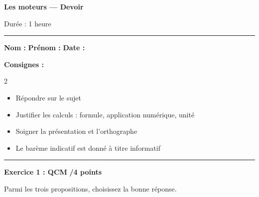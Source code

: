 \documentclass[11pt,a4paper]{article}
\begin{document}
\begin{center}
	\LARGE{\textbf{Les moteurs --- Devoir}}

	\vspace{3mm}

	\large{Durée : 1 heure}
\end{center}

\hrule
\vspace{2mm}

\textbf{Nom :} \dotfill \hspace{2cm} \textbf{Prénom :} \dotfill \hspace{2cm} \textbf{Date :} \dotfill

\vspace{3mm}

\begin{tcolorbox}[colback=blue!5!white, colframe=blue!75!black]
	\textbf{Consignes :}
	\begin{multicols}{2}

	\begin{itemize}
		\item Répondre sur le sujet
		\item Justifier les calculs : formule, application numérique, unité
		\item Soigner la présentation et l'orthographe
		\item Le barème indicatif est donné à titre informatif
	\end{itemize}
		\end{multicols}
\end{tcolorbox}

\vspace{3mm}
\hrule
\vspace{4mm}

\textbf{Exercice 1 : QCM} \hfill \textbf{/4 points}

\vspace{2mm}

Parmi les trois propositions, choisissez la bonne réponse.

\vspace{3mm}
\end{document}
